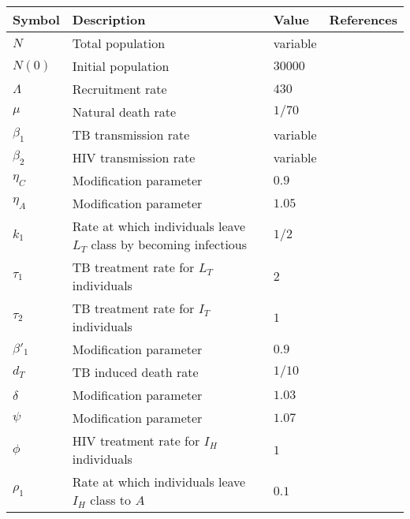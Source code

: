 \documentclass{my_aims}
\theoremstyle{definition}
\begin{document}
\begin{table}[!htb]
\centering
\begin{tabular}{l  p{6.5cm} l  l }
\hline \hline
{\small{Symbol}} &  {\small{Description}}   &  {\small{Value}} & {\small{References}}\\
\hline
{\small{$N$}} & {\small{Total population}} & {\small{variable}}  & \\
{\small{$N(0)$}} & {\small{Initial population}} & {\small{$30000$}}  & \\
{\small{$\Lambda$}} & {\small{Recruitment rate}} & {\small{$430$}}  & \\
{\small{$\mu$}} & {\small{Natural death rate}} &  {\small{$1/70 $}} &  \\
{\small{$\beta_1$}} & {\small{TB transmission rate}} &  {\small{variable}} &  \\
{\small{$\beta_2$}} & {\small{HIV transmission rate}} &  {\small{variable}} &  \\
{\small{$\eta_C$}} & {\small{Modification parameter}} &  {\small{$0.9$}} &  \\
{\small{$\eta_A$}} & {\small{Modification parameter}} &  {\small{$1.05$}} &  \\
{\small{$k_1$}} & {\small{Rate at which individuals leave $L_T$ class by becoming infectious}}
&  {\small{$1/2$}} & {\small{\cite{Castillo_Chavez_1997,SLenhart_2002}}}  \\
{\small{$\tau_1$}} & {\small{TB treatment rate for $L_T$ individuals}}
&  {\small{$2 $}} &  {\small{\cite{Castillo_Chavez_1997,SLenhart_2002}}} \\
{\small{$\tau_2$}} & {\small{TB treatment rate for $I_T$ individuals}}
&  {\small{$1 $}} & {\small{\cite{Castillo_Chavez_1997,SLenhart_2002}}}  \\
{\small{$\beta'_1$}} & {\small{Modification parameter}} &  {\small{$0.9$}} &  \\
{\small{$d_T$}} & {\small{TB induced death rate}} &  {\small{$1/10 $}}
& {\small{\cite{Castillo_Chavez_1997}}} \\
{\small{$\delta$}} & {\small{Modification parameter}} &  {\small{$1.03$}} &  \\
{\small{$\psi$}} & {\small{Modification parameter}} &  {\small{$1.07$}} &  \\
{\small{$\phi$}} & {\small{HIV treatment rate for $I_H$ individuals}} &  {\small{$1$}} &  \\
{\small{$\rho_1$}} & {\small{Rate at which individuals leave $I_H$ class to $A$}}
&  {\small{$0.1 $}} &  \\

\end{tabular}
\end{table}
\end{document}
